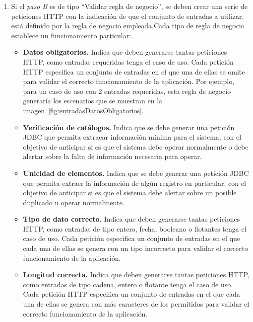\begin{enumerate}
		\begin{enumerate}
			\item Si el {\it paso B} es de tipo ``Validar regla de negocio'', se deben crear una serie de peticiones HTTP con la indicación de que el conjunto de entradas a utilizar, está definido por la regla de negocio empleada.Cada tipo de regla de negocio establece un funcionamiento particular:
	 		\begin{itemize}
	 			\item {\bf Datos obligatorios.} Indica que deben generarse tantas peticiones HTTP, como entradas requeridas tenga el caso de uso. Cada petición HTTP especifica un conjunto de entradas en el que una de ellas se omite para validar el correcto funcionamiento de la aplicación. Por ejemplo, para un caso de uso con 2 entradas requeridas, esta regla de negocio generaría los escenarios que se muestran en la imagen~\ref{fig:entradasDatosObligatorios}.\\
	 			\item {\bf Verificación de catálogos.} Indica que se debe generar una petición JDBC que permita extraear información mínima para el sistema, con el objetivo de anticipar si es que el sistema debe operar normalmente o debe alertar sobre la falta de información necesaria para operar.\\
	 			\item {\bf Unicidad de elementos.} Indica que se debe generar una petición JDBC que permita extraer la información de algún registro en particular, con el objetivo de anticipar si es que el sistema debe alertar sobre un posible duplicado u operar normalmente.\\
				\item {\bf Tipo de dato correcto.} Indica que deben generarse tantas peticiones HTTP, como entradas de tipo entero, fecha, booleano o flotantes tenga el caso de uso. Cada petición especifica un conjunto de entradas en el que cada una de ellas se genera con un tipo incorrecto para validar el correcto funcionamiento de la aplicación.\\
				\item {\bf Longitud correcta.} Indica que deben generarse tantas peticiones HTTP, como entradas de tipo cadena, entero o flotante tenga el caso de uso. Cada petición HTTP especifica un conjunto de entradas en el que cada una de ellas se genera con más caracteres de los permitidos para validar el correcto funcionamiento de la aplicación.\\
	 		\end{itemize}
			

\end{enumerate}
\end{enumerate}
